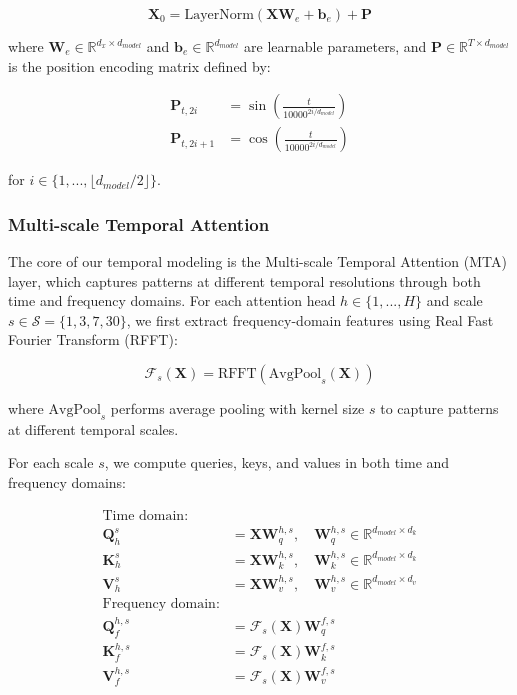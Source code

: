 \begin{equation}
    \mathbf{X}_0 = \text{LayerNorm}(\mathbf{X}\mathbf{W}_e + \mathbf{b}_e) + \mathbf{P}
\end{equation}

where $\mathbf{W}_e \in \mathbb{R}^{d_x \times d_{model}}$ and $\mathbf{b}_e \in \mathbb{R}^{d_{model}}$ are learnable parameters, and $\mathbf{P} \in \mathbb{R}^{T \times d_{model}}$ is the position encoding matrix defined by:

\begin{align}
    \mathbf{P}_{t,2i} &= \sin\left(\frac{t}{10000^{2i/d_{model}}}\right) \\
    \mathbf{P}_{t,2i+1} &= \cos\left(\frac{t}{10000^{2i/d_{model}}}\right)
\end{align}

for $i \in \{1,...,\lfloor d_{model}/2 \rfloor\}$.

\subsubsection{Multi-scale Temporal Attention}
The core of our temporal modeling is the Multi-scale Temporal Attention (MTA) layer, which captures patterns at different temporal resolutions through both time and frequency domains. For each attention head $h \in \{1,...,H\}$ and scale $s \in \mathcal{S} = \{1, 3, 7, 30\}$, we first extract frequency-domain features using Real Fast Fourier Transform (RFFT):

\begin{equation}
    \mathcal{F}_s(\mathbf{X}) = \text{RFFT}(\text{AvgPool}_s(\mathbf{X}))
\end{equation}

where $\text{AvgPool}_s$ performs average pooling with kernel size $s$ to capture patterns at different temporal scales.

For each scale $s$, we compute queries, keys, and values in both time and frequency domains:

\begin{align}
    \text{Time domain:} & \\
    \mathbf{Q}_h^s &= \mathbf{X}\mathbf{W}_q^{h,s}, \quad \mathbf{W}_q^{h,s} \in \mathbb{R}^{d_{model} \times d_k} \\
    \mathbf{K}_h^s &= \mathbf{X}\mathbf{W}_k^{h,s}, \quad \mathbf{W}_k^{h,s} \in \mathbb{R}^{d_{model} \times d_k} \\
    \mathbf{V}_h^s &= \mathbf{X}\mathbf{W}_v^{h,s}, \quad \mathbf{W}_v^{h,s} \in \mathbb{R}^{d_{model} \times d_v} \\
    \text{Frequency domain:} & \\
    \mathbf{Q}_f^{h,s} &= \mathcal{F}_s(\mathbf{X})\mathbf{W}_q^{f,s} \\
    \mathbf{K}_f^{h,s} &= \mathcal{F}_s(\mathbf{X})\mathbf{W}_k^{f,s} \\
    \mathbf{V}_f^{h,s} &= \mathcal{F}_s(\mathbf{X})\mathbf{W}_v^{f,s}
\end{align}

